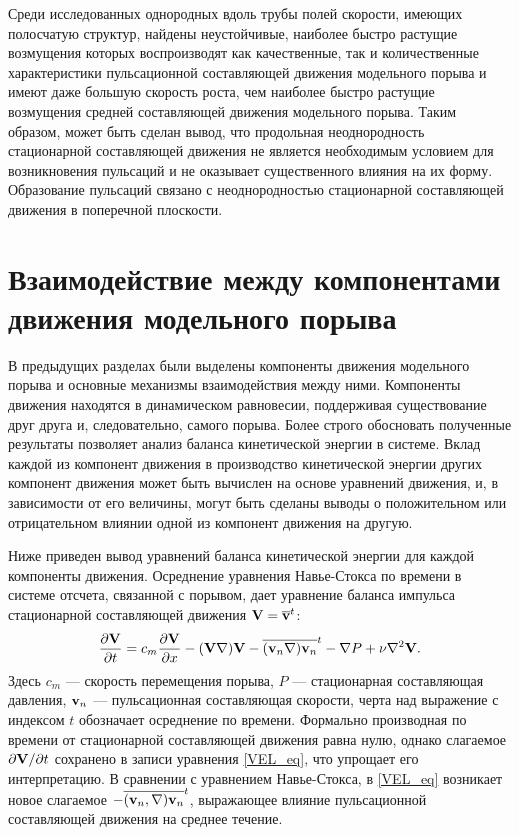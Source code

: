 Среди исследованных однородных вдоль трубы полей скорости, имеющих полосчатую структур, найдены неустойчивые, наиболее быстро растущие возмущения которых воспроизводят как качественные, так и количественные характеристики пульсационной составляющей движения модельного порыва и имеют даже большую скорость роста, чем наиболее быстро растущие возмущения средней составляющей движения модельного порыва. Таким образом, может быть сделан вывод, что продольная неоднородность стационарной составляющей движения не является необходимым условием для возникновения пульсаций и не оказывает существенного влияния на их форму. Образование пульсаций связано с неоднородностью стационарной составляющей движения в поперечной плоскости. 


\section{Взаимодействие между компонентами движения модельного порыва}

В предыдущих разделах были выделены компоненты движения модельного порыва и основные механизмы взаимодействия между ними. Компоненты движения находятся в динамическом равновесии, поддерживая существование друг друга и, следовательно, самого порыва. Более строго обосновать полученные результаты позволяет анализ баланса кинетической энергии в системе. Вклад каждой из компонент движения в производство кинетической энергии других компонент движения может быть вычислен на основе уравнений движения, и, в зависимости от его величины, могут быть сделаны выводы о положительном или отрицательном влиянии одной из компонент движения на другую. 

Ниже приведен вывод уравнений баланса кинетической энергии для каждой компоненты движения. 
Осреднение уравнения Навье-Стокса по времени в системе отсчета, связанной с порывом, дает уравнение баланса импульса стационарной составляющей движения $\mathbf{V} = \overline{\mathbf{v}}^t$:
\begin{equation} \label{VEL_eq}
\frac{\partial \mathbf{V}}{\partial t} = c_m \frac{\partial \mathbf{V}}{\partial x} - (\mathbf{V} \nabla) \mathbf{V} - \overline{(\mathbf{v}_n \nabla) \mathbf{v}_n}^t - \nabla P + \nu \nabla^2 \mathbf{V}.
\end{equation}
Здесь $c_m$ --- скорость перемещения порыва, $P$ --- стационарная составляющая давления, $\mathbf{v}_n$ --- пульсационная составляющая скорости, черта над выражение с индексом $t$ обозначает осреднение по времени. Формально производная по времени от стационарной составляющей движения равна нулю, однако слагаемое $\partial \mathbf{V}/ \partial t$ сохранено в записи уравнения \eqref{VEL_eq}, что упрощает его интерпретацию. В сравнении с уравнением Навье-Стокса, в \eqref{VEL_eq} возникает новое слагаемое $-\overline{(\mathbf{v}_n, \nabla) \mathbf{v}_n}^t$, выражающее влияние пульсационной составляющей движения на среднее течение. 

